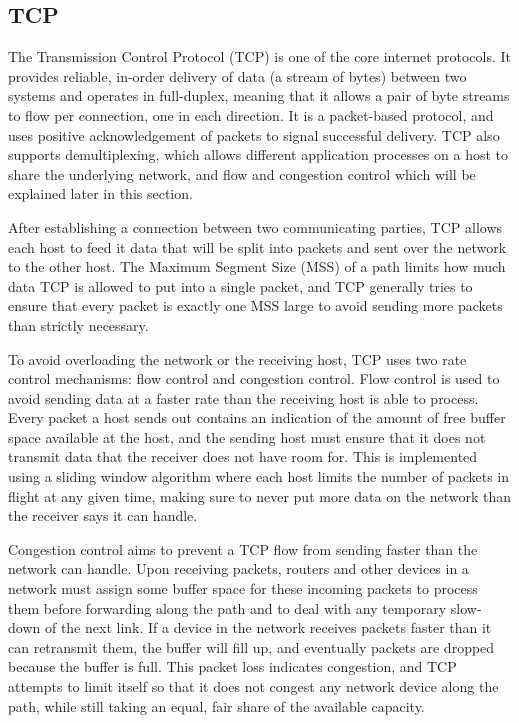 \subsection{TCP}
\label{sec:bg:tcp}
The Transmission Control Protocol (TCP) is one of the core internet protocols.
It provides reliable, in-order delivery of data (a stream of bytes) between two
systems and operates in full-duplex, meaning that it allows a pair of byte
streams to flow per connection, one in each direction. It is a packet-based
protocol, and uses positive acknowledgement of packets to signal successful
delivery. TCP also supports demultiplexing, which allows different application
processes on a host to share the underlying network, and flow and congestion
control which will be explained later in this section.

After establishing a connection between two communicating parties, TCP allows
each host to feed it data that will be split into packets and sent over the
network to the other host. The Maximum Segment Size (MSS) of a path limits
how much data TCP is allowed to put into a single packet, and TCP generally
tries to ensure that every packet is exactly one MSS large to avoid sending
more packets than strictly necessary.

To avoid overloading the network or the receiving host, TCP uses two rate
control mechanisms: flow control and congestion control. Flow control is used to
avoid sending data at a faster rate than the receiving host is able to process.
Every packet a host sends out contains an indication of the amount of free
buffer space available at the host, and the sending host must ensure that it
does not transmit data that the receiver does not have room for. This is
implemented using a sliding window algorithm where each host limits the number
of packets in flight at any given time, making sure to never put more data on
the network than the receiver says it can handle.

Congestion control aims to prevent a TCP flow from sending faster than the
network can handle. Upon receiving packets, routers and other devices in a
network must assign some buffer space for these incoming packets to process them
before forwarding along the path and to deal with any temporary slow-down of the
next link. If a device in the network receives packets faster than it can
retransmit them, the buffer will fill up, and eventually packets are dropped
because the buffer is full. This packet loss indicates congestion, and TCP
attempts to limit itself so that it does not congest any network device along
the path, while still taking an equal, fair share of the available capacity.

